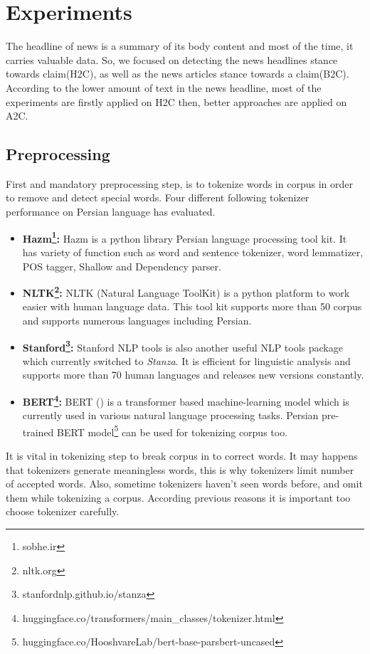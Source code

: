 \section{Experiments}
The headline of news is a summary of its body content and most of the time, it carries valuable data. So, we focused on detecting the news headlines stance towards claim(H2C), as well as the news articles stance towards a claim(B2C). According to the lower amount of text in the news headline, most of the experiments are firstly applied on H2C then, better approaches are applied on A2C.  
\subsection{Preprocessing}
First and mandatory preprocessing step, is to tokenize words in corpus in order to remove and detect special words. Four different following tokenizer performance on Persian language has evaluated. 
\begin{itemize}
	\item \textbf{Hazm\footnote{sobhe.ir}:}
	Hazm is a python library Persian language processing tool kit. It has variety of function such as word and sentence tokenizer, word lemmatizer, POS tagger, Shallow and Dependency parser.
	
	\item \textbf{NLTK\footnote{nltk.org}:}
	NLTK (Natural Language ToolKit) is a python platform to work easier with human language data. This tool kit supports more than 50 corpus and supports numerous languages including Persian. 
	
	\item \textbf{Stanford\footnote{stanfordnlp.github.io/stanza}:}
	Stanford NLP tools is also another useful NLP tools package which currently switched to \textit{Stanza}. It is efficient for linguistic analysis and supports more than 70 human languages and releases new versions constantly.
	
	\item \textbf{BERT\footnote{huggingface.co/transformers/main\_classes/tokenizer.html}:}
	BERT (\cite{bert}) is a transformer based machine-learning model which is currently used in various natural language processing tasks. Persian pre-trained BERT model\footnote{huggingface.co/HooshvareLab/bert-base-parsbert-uncased} can be used for tokenizing corpus too. 
\end{itemize}

It is vital in tokenizing step to break corpus in to correct words. It may happens that tokenizers generate meaningless words, this is why tokenizers limit number of accepted words. Also, sometime tokenizers haven't seen words before, and omit them while tokenizing a corpus. According previous reasons it is important too choose tokenizer carefully.


